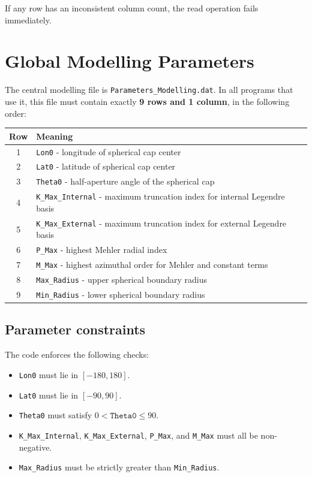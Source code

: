\documentclass[11pt,a4paper]{article}
\begin{document}
If any row has an inconsistent column count, the read operation fails immediately.

\section{Global Modelling Parameters}

The central modelling file is \texttt{Parameters\_Modelling.dat}. In all programs that use it, this file must contain exactly \textbf{9 rows and 1 column}, in the following order:

\begin{center}
\begin{tabular}{cl}
\toprule
Row & Meaning \\
\midrule
1 & \texttt{Lon0} - longitude of spherical cap center \\
2 & \texttt{Lat0} - latitude of spherical cap center \\
3 & \texttt{Theta0} - half-aperture angle of the spherical cap \\
4 & \texttt{K\_Max\_Internal} - maximum truncation index for internal Legendre basis \\
5 & \texttt{K\_Max\_External} - maximum truncation index for external Legendre basis \\
6 & \texttt{P\_Max} - highest Mehler radial index \\
7 & \texttt{M\_Max} - highest azimuthal order for Mehler and constant terms \\
8 & \texttt{Max\_Radius} - upper spherical boundary radius \\
9 & \texttt{Min\_Radius} - lower spherical boundary radius \\
\bottomrule
\end{tabular}
\end{center}

\subsection{Parameter constraints}

The code enforces the following checks:
\begin{itemize}
  \item \texttt{Lon0} must lie in $[-180,180]$.
  \item \texttt{Lat0} must lie in $[-90,90]$.
  \item \texttt{Theta0} must satisfy $0 < \texttt{Theta0} \le 90$.
  \item \texttt{K\_Max\_Internal}, \texttt{K\_Max\_External}, \texttt{P\_Max}, and \texttt{M\_Max} must all be non-negative.
  \item \texttt{Max\_Radius} must be strictly greater than \texttt{Min\_Radius}.
\end{itemize}
\end{document}
